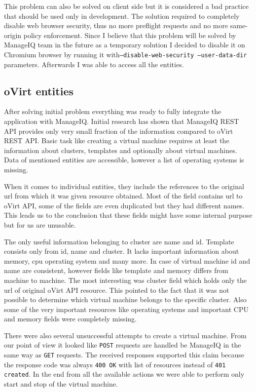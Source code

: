 This problem can also be solved on client side but it is considered a bad practice that should be used only in development. The solution required to completely disable web browser security, thus no more preflight requests and no more same-origin policy enforcement. Since I believe that this problem will be solved by ManageIQ team in the future as a temporary solution I decided to disable it on Chromium browser by running it with\texttt{--disable-web-security --user-data-dir} parameters. Afterwards I was able to access all the entities.

\subsection{oVirt entities}
After solving initial problem everything was ready to fully integrate the application with ManageIQ. Initial research has shown that ManageIQ REST API provides only very small fraction of the information compared to oVirt REST API.
Basic task like creating a virtual machine requires at least the information about clusters, templates and optionally about virtual machines. Data of mentioned entities are accessible, however a list of operating systems is missing. 

When it comes to individual entities, they include the references to the original url from which it was given resource obtained. Most of the field contains url to oVirt API, some of the fields are even duplicated but they had different names. This leads us to the conclusion that these fields might have some internal purpose but for us are unusable. 

The only useful information belonging to cluster are name and id. Template consists only from id, name and cluster. It lacks important information about memory, cpu operating system and many more. In case of virtual machine id and name are consistent, however fields like template and memory differs from machine to machine. The most interesting was cluster field which holds only the url of original oVirt API resource. This pointed to the fact that it was not possible to determine which virtual machine belongs to the specific cluster. Also some of the very important resources like operating systems and important CPU and memory fields were completely missing.

There were also several unsuccessful attempts to create a virtual machine. From our point of view it looked like \texttt{POST} requests are handled be ManageIQ in the same way as \texttt{GET} requests. The received responses supported this	claim because the response code was always \texttt{400 OK} with list of resources instead of \texttt{401 created}. In the end from all the available actions we were able to perform only start and stop of the virtual machine.

